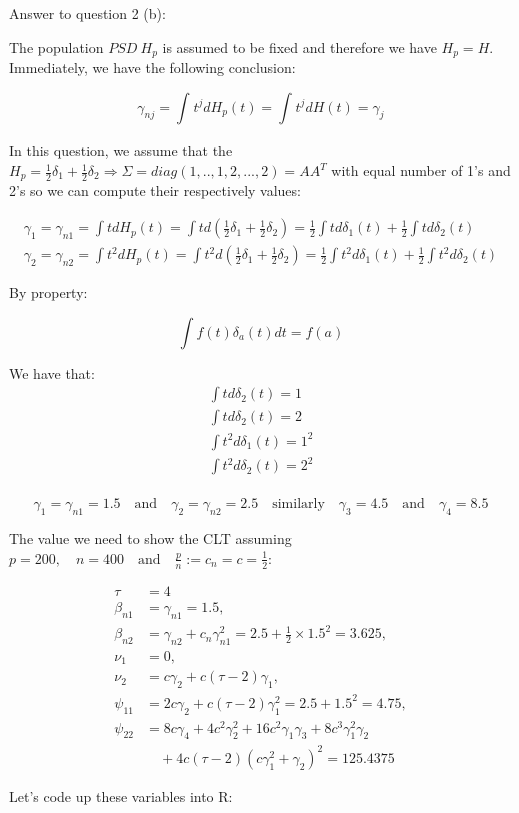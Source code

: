 \documentclass[
]{article}
\begin{document}
Answer to question 2 (b):

The population \(PSD \ H_p\) is assumed to be fixed and therefore we
have \(H_p = H\). Immediately, we have the following conclusion:

\[
\gamma_{nj} = \int_{} t^jdH_p(t) = \int_{} t^jdH(t) = \gamma_j
\]

In this question, we assume that the
\(H_p = \frac{1}{2} \delta_1 + \frac{1}{2} \delta_2 \Rightarrow \Sigma = diag(1,..,1,2,...,2)=AA^T\)
with equal number of 1's and 2's so we can compute their respectively
values:

\begin{align*}
\gamma_1 = \gamma_{n1} = \int t dH_p(t) = \int t d(\frac{1}{2}\delta_1 + \frac{1}{2}\delta_2) = \frac{1}{2} \int t d\delta_1(t) + \frac{1}{2} \int t d \delta_2(t) \\
\gamma_2 = \gamma_{n2} = \int t^2 dH_p(t) = \int t^2 d(\frac{1}{2}\delta_1 + \frac{1}{2}\delta_2) = \frac{1}{2} \int t^2 d\delta_1(t) + \frac{1}{2} \int t^2 d \delta_2(t)
\end{align*}

By property:

\[
\begin{equation*}
\int f(t) \delta_a(t)dt = f(a) \tag{1}
\end{equation*}
\]

We have that: \begin{align*}
\int t d \delta_2(t) = 1\\
\int t d \delta_2(t) = 2\\
\int t^2 d\delta_1(t) = 1^2\\
\int t^2 d\delta_2(t) = 2^2\\
\end{align*}

\[
\gamma_1  = \gamma_{n1} = 1.5 \quad \text{and} \quad \gamma_2 = \gamma_{n2} =2.5 \quad \text{similarly} \quad \gamma_3 = 4.5 \quad \text{and} \quad \gamma_4 = 8.5
\]

The value we need to show the CLT assuming
\(p = 200, \quad n = 400 \quad \text{and} \quad \frac{p}{n} :=c_n = c = \frac{1}{2}\):

\begin{align*}
\tau & = 4 \\
\beta_{n1} & = \gamma_{n1} = 1.5, \\
\beta_{n2} & = \gamma_{n2} + c_n\gamma^2_{n1} = 2.5 + \frac{1}{2} \times 1.5^2 = 3.625, \\
\nu_1 & = 0, \\
\nu_2 & = c\gamma_2 + c(\tau - 2)\gamma_1, \\
\psi_{11} & = 2c\gamma_2 + c(\tau - 2)\gamma^2_1 = 2.5 + 1.5^2 = 4.75, \\
\psi_{22} & = 8c\gamma_4 + 4c^2\gamma^2_2 + 16c^2\gamma_1\gamma_3 + 8c^3\gamma^2_1 \gamma_2 \\
& \quad + 4c(\tau - 2)(c\gamma^2_1 + \gamma_2)^2 = 125.4375
\end{align*}

Let's code up these variables into R:
\end{document}
